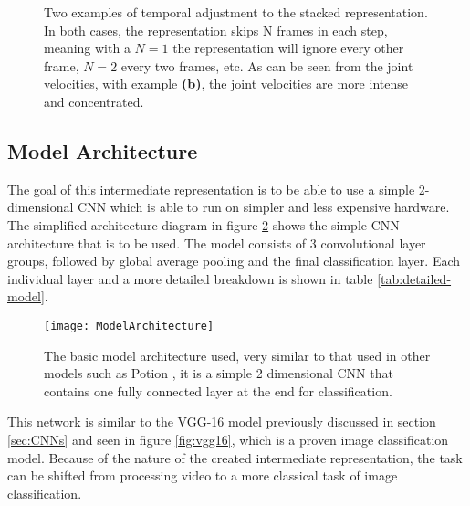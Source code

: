 \begin{figure}[ht]
	\centering
	\caption{Two examples of temporal adjustment to the stacked representation. In both cases, the representation skips N frames in each step, meaning with a $N = 1$ the representation will ignore every other frame, $N = 2$ every two frames, etc. As can be seen from the joint velocities, with example \textbf{(b)}, the joint velocities are more intense and concentrated.}
	\label{fig:intermediate-stacked-skip}
\end{figure}

\subsection{Model Architecture}

The goal of this intermediate representation is to be able to use a simple 2-dimensional CNN which is able to run on simpler and less expensive hardware. The simplified architecture diagram in figure \ref{fig:model-architecture} shows the simple CNN architecture that is to be used. The model consists of 3 convolutional layer groups, followed by global average pooling and the final classification layer. Each individual layer and a more detailed breakdown is shown in table \ref{tab:detailed-model}. 

\begin{figure}[ht]
	\texttt{[image: ModelArchitecture]}
	\centering
	\caption{The basic model architecture used, very similar to that used in other models such as Potion \cite{potion}, it is a simple 2 dimensional CNN that contains one fully connected layer at the end for classification.}
	\label{fig:model-architecture}
\end{figure}

This network is similar to the VGG-16 model previously discussed in section \ref{sec:CNNs} and seen in figure \ref{fig:vgg16}, which is a proven image classification model. Because of the nature of the created intermediate representation, the task can be shifted from processing video to a more classical task of image classification.

